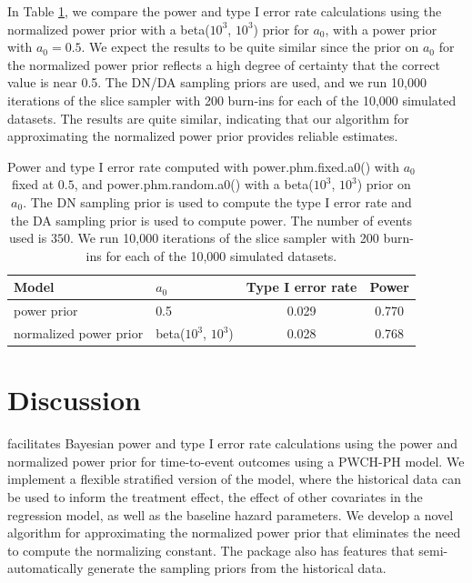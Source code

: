 In Table \ref{power_npp}, we compare the power and type I error rate calculations using the normalized power prior with a beta($10^3$, $10^3$) prior for $a_0$, with a power prior with $a_0=0.5$. We expect the results to be quite similar since the prior on $a_0$ for the normalized power prior reflects a high degree of certainty that the correct value is near 0.5. The DN/DA sampling priors are used, and we run 10,000 iterations of the slice sampler with 200 burn-ins for each of the 10,000 simulated datasets. The results are quite similar, indicating that our algorithm for approximating the normalized power prior provides reliable estimates. 

\begin{table}[H]
\centering
\setlength{\extrarowheight}{5pt}
\begin{tabular}{llcc}
\hline
Model & $a_0$ & Type I error rate & Power \\[8pt]
\hline
power prior & 0.5 & 0.029 & 0.770 \\ 
normalized power prior & beta($10^3$, $10^3$)& 0.028 & 0.768\\ 
\hline
\end{tabular}
\caption{Power and type I error rate computed with power.phm.fixed.a0() with $a_0$ fixed at $0.5$, and power.phm.random.a0() with a beta($10^3$, $10^3$) prior on $a_0$. The DN sampling prior is used to compute the type I error rate and the DA sampling prior is used to compute power. The number of events used is $350$. We run 10,000 iterations of the slice sampler with 200 burn-ins for each of the 10,000 simulated datasets.}
\label{power_npp}
\end{table}

\section{Discussion} \label{sec:discussion}

 facilitates Bayesian power and type I error rate calculations using the power and normalized power prior for time-to-event outcomes using a PWCH-PH model. We implement a flexible stratified version of the model, where the historical data can be used to inform the treatment effect, the effect of other covariates in the regression model, as well as the baseline hazard parameters. We develop a novel algorithm for approximating the normalized power prior that eliminates the need to compute the normalizing constant. The package also has features that semi-automatically generate the sampling priors from the historical data. 

